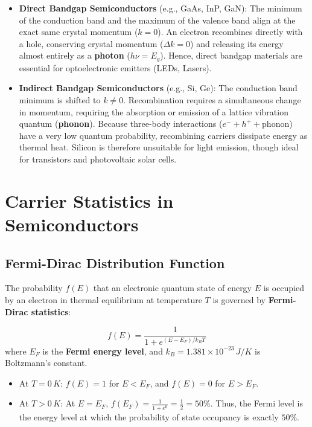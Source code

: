 \begin{itemize}
    \item \textbf{Direct Bandgap Semiconductors} (e.g., GaAs, InP, GaN): The minimum of the conduction band and the maximum of the valence band align at the exact same crystal momentum ($k = 0$). An electron recombines directly with a hole, conserving crystal momentum ($\Delta k = 0$) and releasing its energy almost entirely as a \textbf{photon} ($h\nu = E_g$). Hence, direct bandgap materials are essential for optoelectronic emitters (LEDs, Lasers).
    \item \textbf{Indirect Bandgap Semiconductors} (e.g., Si, Ge): The conduction band minimum is shifted to $k \neq 0$. Recombination requires a simultaneous change in momentum, requiring the absorption or emission of a lattice vibration quantum (\textbf{phonon}). Because three-body interactions ($e^- + h^+ + \text{phonon}$) have a very low quantum probability, recombining carriers dissipate energy as thermal heat. Silicon is therefore unsuitable for light emission, though ideal for transistors and photovoltaic solar cells.
\end{itemize}

\section{Carrier Statistics in Semiconductors}

\subsection{Fermi-Dirac Distribution Function}
The probability $f(E)$ that an electronic quantum state of energy $E$ is occupied by an electron in thermal equilibrium at temperature $T$ is governed by \textbf{Fermi-Dirac statistics}:

\begin{keyequation}
\begin{equation}
    f(E) = \frac{1}{1 + e^{(E - E_F)/k_B T}}
\end{equation}
where $E_F$ is the \textbf{Fermi energy level}, and $k_B = 1.381 \times 10^{-23}\,\si{J/K}$ is Boltzmann's constant.
\end{keyequation}
\begin{itemize}
    \item At $T = 0\,\si{K}$: $f(E) = 1$ for $E < E_F$, and $f(E) = 0$ for $E > E_F$.
    \item At $T > 0\,\si{K}$: At $E = E_F$, $f(E_F) = \frac{1}{1 + e^0} = \frac{1}{2} = 50\%$. Thus, the Fermi level is the energy level at which the probability of state occupancy is exactly $50\%$.
\end{itemize}

